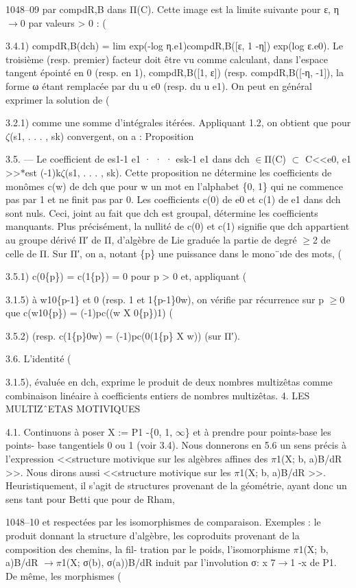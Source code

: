 \documentclass[11pt]{article}
\begin{document}
1048--09 par compdR,B dans Π(C). Cette image est la limite suivante pour ε, η \(\to\)0 par valeurs > 0 : (

3.4.1) compdR,B(dch) = lim exp(-log η.e1)compdR,B([ε, 1 -η]) exp(log ε.e0). Le troisième (resp. premier) facteur doit être vu comme calculant, dans l’espace tangent épointé en 0 (resp. en 1), compdR,B([1, ε]) (resp. compdR,B([-η, -1]), la forme ω étant remplacée par du u e0 (resp. du u e1). On peut en général exprimer la solution de (

3.2.1) comme une somme d’intégrales itérées. Appliquant 1.2, on obtient que pour \(\zeta\)(s1, . . . , sk) convergent, on a : Proposition 

3.5. --- Le coefficient de es1-1 e1 · · · esk-1 e1 dans dch \(\in\)Π(C) \(\subset\) C<<e0, e1 >>\(*\)est (-1)k\(\zeta\)(s1, . . . , sk). Cette proposition ne détermine les coefficients de monômes c(w) de dch que pour w un mot en l’alphabet \{0, 1\} qui ne commence pas par 1 et ne finit pas par 0. Les coefficients c(0) de e0 et c(1) de e1 dans dch sont nuls. Ceci, joint au fait que dch est groupal, détermine les coefficients manquants. Plus précisément, la nullité de c(0) et c(1) signifie que dch appartient au groupe dérivé Π′ de Π, d’algèbre de Lie graduée la partie de degré \(\ge\)2 de celle de Π. Sur Π′, on a, notant \{p\} une puissance dans le mono¨ıde des mots, (

3.5.1) c(0\{p\}) = c(1\{p\}) = 0 pour p > 0 et, appliquant (

3.1.5) à w10\{p-1\} et 0 (resp. 1 et 1\{p-1\}0w), on vérifie par récurrence sur p \(\ge\)0 que c(w10\{p\}) = (-1)pc((w X 0\{p\})1) (

3.5.2) (resp. c(1\{p\}0w) = (-1)pc(0(1\{p\} X w)) (sur Π′). 

3.6. L’identité (

3.1.5), évaluée en dch, exprime le produit de deux nombres multizêtas comme combinaison linéaire à coefficients entiers de nombres multizêtas. 4. LES MULTIZˆETAS MOTIVIQUES 

4.1. Continuons à poser X := P1 -\{0, 1, \(\infty\)\} et à prendre pour points-base les points- base tangentiels 0 ou 1 (voir 3.4). Nous donnerons en 5.6 un sens précis à l’expression <<structure motivique sur les algèbres affines des \(\pi\)1(X; b, a)B/dR >>. Nous dirons aussi <<structure motivique sur les \(\pi\)1(X; b, a)B/dR >>. Heuristiquement, il s’agit de structures provenant de la géométrie, ayant donc un sens tant pour Betti que pour de Rham,

1048--10 et respectées par les isomorphismes de comparaison. Exemples : le produit donnant la structure d’algèbre, les coproduits provenant de la composition des chemins, la fil- tration par le poids, l’isomorphisme \(\pi\)1(X; b, a)B/dR \(\to\)\(\pi\)1(X; σ(b), σ(a))B/dR induit par l’involution σ: x 7\(\to\)1 -x de P1. De même, les morphismes (
\end{document}
